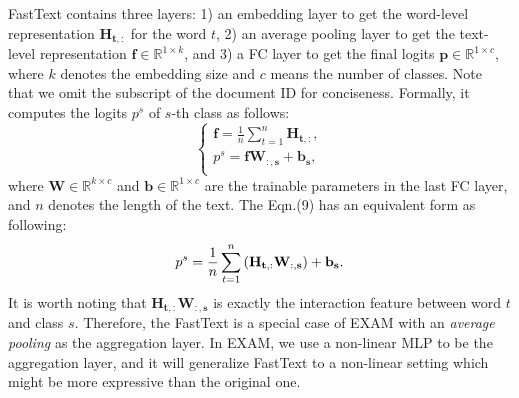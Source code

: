 \documentclass[letterpaper]{article} %
\begin{document}
FastText contains three layers: 1) an embedding layer to get the word-level representation $\mathbf{H_{t,:}}$ for the word $t$, 2) an average pooling layer to get the text-level representation $\mathbf{f} \in \mathbb{R}^{1 \times k}$, and 3) a FC layer to get the final logits $\mathbf{p} \in \mathbb{R}^{1 \times c}$, where $k$ denotes the embedding size and $c$ means the number of classes. Note that we omit the subscript of the document ID for conciseness. Formally, it computes the logits $p^{s}$ of $s$-th class as follows:
%
\begin{equation}
\left\{
\begin{array}{lr}
\mathbf{f} = \frac{1}{n}\sum_{t=1}^{n}\mathbf{H_{t,:}},\\
p^{s} = \mathbf{fW_{:,s} + b_{s}},\\
\end{array}
\right.
\end{equation}
where $\mathbf{W} \in \mathbb{R}^{k \times c}$ and $\mathbf{b} \in \mathbb{R}^{1 \times c}$ are the trainable parameters in the last FC layer, and $n$ denotes the length of the text. The Eqn.(9) has an equivalent form as following:
\begin{equation}
p^{s} = \frac{1}{n}\sum_{t=1}^{n}\mathbf{(H_{t,:}W_{:,s}) + b_{s}}.\\
\end{equation}
It is worth noting that $\mathbf{H_{t,:}W_{:,s}}$ is exactly the interaction feature between word $t$ and class $s$. Therefore, the FastText is a special case of EXAM with an \textit{average pooling} as the aggregation layer. In EXAM, we use a non-linear MLP to be the aggregation layer, and it will generalize FastText to a non-linear setting which might be more expressive than the original one.
\end{document}
